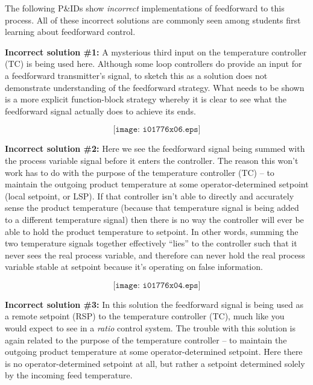
The following P\&IDs show {\it incorrect} implementations of feedforward to this process.  All of these incorrect solutions are commonly seen among students first learning about feedforward control.

\vskip 20pt


\noindent
{\bf Incorrect solution \#1:} A mysterious third input on the temperature controller (TC) is being used here.  Although some loop controllers do provide an input for a feedforward transmitter's signal, to sketch this as a solution does not demonstrate understanding of the feedforward strategy.  What needs to be shown is a more explicit function-block strategy whereby it is clear to see what the feedforward signal actually does to achieve its ends.

$$\texttt{[image: i01776x06.eps]}$$

\vskip 10pt

\filbreak



\noindent
{\bf Incorrect solution \#2:} Here we see the feedforward signal being summed with the process variable signal before it enters the controller.  The reason this won't work has to do with the purpose of the temperature controller (TC) -- to maintain the outgoing product temperature at some operator-determined setpoint (local setpoint, or LSP).  If that controller isn't able to directly and accurately sense the product temperature (because that temperature signal is being added to a different temperature signal) then there is no way the controller will ever be able to hold the product temperature to setpoint.  In other words, summing the two temperature signals together effectively ``lies'' to the controller such that it never sees the real process variable, and therefore can never hold the real process variable stable at setpoint because it's operating on false information.

$$\texttt{[image: i01776x04.eps]}$$



\vskip 10pt

\filbreak


\noindent
{\bf Incorrect solution \#3:} In this solution the feedforward signal is being used as a remote setpoint (RSP) to the temperature controller (TC), much like you would expect to see in a {\it ratio} control system.  The trouble with this solution is again related to the purpose of the temperature controller -- to maintain the outgoing product temperature at some operator-determined setpoint.  Here there is no operator-determined setpoint at all, but rather a setpoint determined solely by the incoming feed temperature.  

